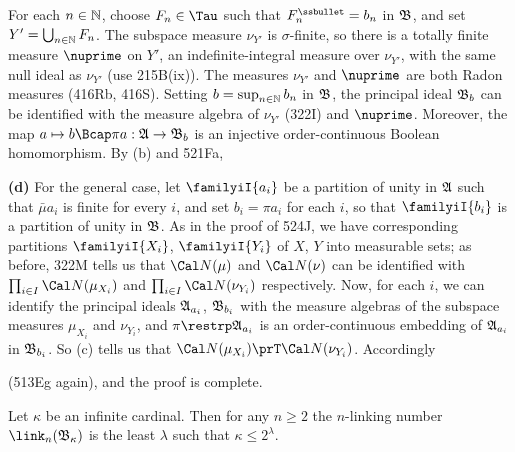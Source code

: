 {For each $n\in\Bbb N$, choose $F_n\in\Tau$ such that $F_n^{\ssbullet}=b_n$
in $\frak B$, and set $Y'=\bigcup_{n\in\Bbb N}F_n$.   The subspace measure
$\nu_{Y'}$ is $\sigma$-finite, so there is a totally finite measure
$\nuprime$ on $Y'$, an indefinite-integral measure over $\nu_{Y'}$,
with the same null ideal as $\nu_{Y'}$ (use 215B(ix)).
The measures $\nu_{Y'}$ and $\nuprime$ are
both Radon measures (416Rb, 416S).   Setting $b=\sup_{n\in\Bbb N}b_n$ in
$\frak B$, the principal ideal $\frak B_b$ can be identified with the
measure algebra of $\nu_{Y'}$ (322I) and $\nuprime$.   Moreover, the map
$a\mapsto b\Bcap\pi a:\frak A\to\frak B_b$ is an injective order-continuous
Boolean homomorphism.   By (b) and 521Fa,


\medskip

{\bf (d)} For the general case, let $\familyiI{a_i}$ be a partition of
unity in $\frak A$ such that $\bar\mu a_i$ is finite for every $i$, and
set $b_i=\pi a_i$ for each $i$, so that $\familyiI{b_i}$ is a partition of
unity in $\frak B$.   As in the proof of 524J, we have corresponding
partitions $\familyiI{X_i}$, $\familyiI{Y_i}$ of $X$, $Y$ into measurable
sets;  as before, 322M tells us that $\Cal N(\mu)$ and $\Cal N(\nu)$ can be
identified with $\prod_{i\in I}\Cal N(\mu_{X_i})$ and
$\prod_{i\in I}\Cal N(\nu_{Y_i})$ respectively.
Now, for each $i$, we can identify the principal ideals
$\frak A_{a_i}$, $\frak B_{b_i}$ with the measure algebras of the subspace
measures $\mu_{X_i}$ and $\nu_{Y_i}$, and $\pi\restrp\frak A_{a_i}$ is an
order-continuous embedding of $\frak A_{a_i}$ in $\frak B_{b_i}$.   So (c)
tells us that $\Cal N(\mu_{X_i})\prT\Cal N(\nu_{Y_i})$.   Accordingly


\noindent (513Eg again), and the proof is complete.
}%

 Let
$\kappa$ be an infinite cardinal.   Then for any $n\ge 2$ the
$n$-linking number $\link_n(\frak B_{\kappa})$ is the least $\lambda$
such that $\kappa\le 2^{\lambda}$.

